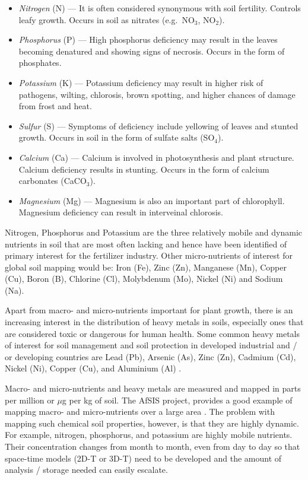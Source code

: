 \documentclass[11pt]{krantz}
\makeatletter
\newenvironment{kframe}{%
\medskip{}
\setlength{\fboxsep}{.8em}
 \def\at@end@of@kframe{}%
 \ifinner\ifhmode%
  \def\at@end@of@kframe{\end{minipage}}%
  \begin{minipage}{\columnwidth}%
 \fi\fi%
 \def\FrameCommand##1{\hskip\@totalleftmargin \hskip-\fboxsep
 \colorbox{shadecolor}{##1}\hskip-\fboxsep
     \hskip-\linewidth \hskip-\@totalleftmargin \hskip\columnwidth}%
 \MakeFramed {\advance\hsize-\width
   \@totalleftmargin\z@ \linewidth\hsize
   \@setminipage}}%
 {\par\unskip\endMakeFramed%
 \at@end@of@kframe}
\newenvironment{rmdblock}[1]
  {
  \begin{itemize}
  \renewcommand{\labelitemi}{
    \raisebox{-.7\height}[0pt][0pt]{
      {\setkeys{Gin}{width=3em,keepaspectratio}\texttt{[image: images/\#1]}}
    }
  }
  \setlength{\fboxsep}{1em}
  \begin{kframe}
  \item
  }
  {
  \end{kframe}
  \end{itemize}
  }
\newenvironment{rmdnote}
  {\begin{rmdblock}{note}}
  {\end{rmdblock}}
\theoremstyle{definition}
\theoremstyle{definition}
\theoremstyle{definition}
\theoremstyle{remark}
\makeatother
\begin{document}
\begin{itemize}
\item
  \emph{Nitrogen} (N) --- It is often considered synonymous with soil
  fertility. Controls leafy growth. Occurs in soil as nitrates
  (e.g.~NO\(_3\), NO\(_2\)).
\item
  \emph{Phosphorus} (P) --- High phosphorus deficiency may result in the
  leaves becoming denatured and showing signs of necrosis. Occurs in the
  form of phosphates.
\item
  \emph{Potassium} (K) --- Potassium deficiency may result in higher
  risk of pathogens, wilting, chlorosis, brown spotting, and higher
  chances of damage from frost and heat.
\item
  \emph{Sulfur} (S) --- Symptoms of deficiency include yellowing of
  leaves and stunted growth. Occurs in soil in the form of sulfate salts
  (SO\(_4\)).
\item
  \emph{Calcium} (Ca) --- Calcium is involved in photosynthesis and
  plant structure. Calcium deficiency results in stunting. Occurs in the
  form of calcium carbonates (CaCO\(_3\)).
\item
  \emph{Magnesium} (Mg) --- Magnesium is also an important part of
  chlorophyll. Magnesium deficiency can result in interveinal chlorosis.
\end{itemize}

\begin{rmdnote}
Nitrogen, Phosphorus and Potassium are the three relatively mobile and
dynamic nutrients in soil that are most often lacking and hence have
been identified of primary interest for the fertilizer industry. Other
micro-nutrients of interest for global soil mapping would be: Iron (Fe),
Zinc (Zn), Manganese (Mn), Copper (Cu), Boron (B), Chlorine (Cl),
Molybdenum (Mo), Nickel (Ni) and Sodium (Na).
\end{rmdnote}

Apart from macro- and micro-nutrients important for plant growth, there
is an increasing interest in the distribution of heavy metals in soils,
especially ones that are considered toxic or dangerous for human health.
Some common heavy metals of interest for soil management and soil
protection in developed industrial and / or developing countries are
Lead (Pb), Arsenic (As), Zinc (Zn), Cadmium (Cd), Nickel (Ni), Copper
(Cu), and Aluminium (Al)
\citep{Markus2001399, reimann2011statistical, Morel2005202, Rodriguez-Lado23082013, hengl2017soil}.

Macro- and micro-nutrients and heavy metals are measured and mapped in
parts per million or \(\mu\)g per kg of soil. The AfSIS project,
provides a good example of mapping macro- and micro-nutrients over a
large area \citep{hengl2017soil}. The problem with mapping such chemical
soil properties, however, is that they are highly dynamic. For example,
nitrogen, phosphorus, and potassium are highly mobile nutrients. Their
concentration changes from month to month, even from day to day so that
space-time models (2D-T or 3D-T) need to be developed and the amount of
analysis / storage needed can easily escalate.
\end{document}
